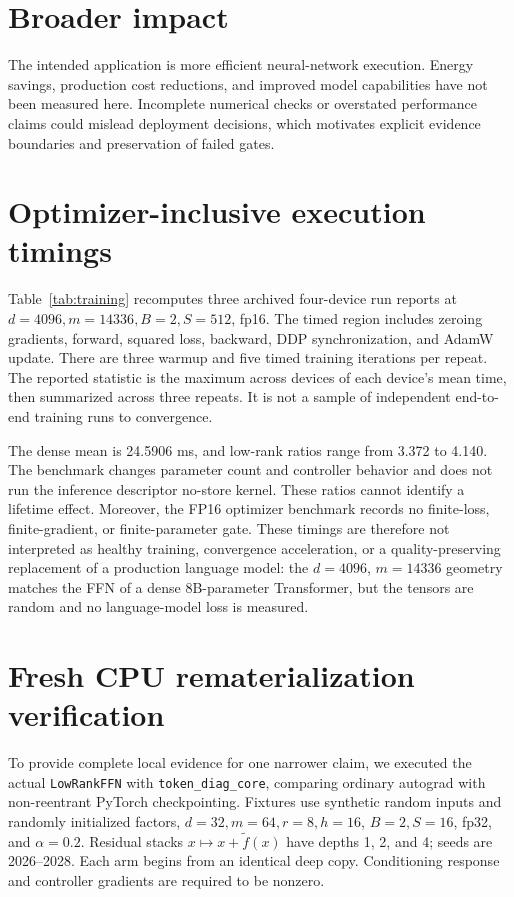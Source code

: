 \section*{Broader impact}
The intended application is more efficient neural-network execution. Energy
savings, production cost reductions, and improved model capabilities have not
been measured here. Incomplete numerical checks or overstated performance
claims could mislead deployment decisions, which motivates explicit evidence
boundaries and preservation of failed gates.


\appendix
\section{Optimizer-inclusive execution timings}
Table~\ref{tab:training} recomputes three archived four-device run reports at
$d=4096,m=14336,B=2,S=512$, fp16. The timed region includes zeroing gradients,
forward, squared loss, backward, DDP synchronization, and AdamW update.
There are three warmup and five timed training iterations per repeat. The
reported statistic is the maximum across devices of each device's mean time,
then summarized across three repeats. It is not a sample of independent
end-to-end training runs to convergence.

\begin{table}[t]
\centering\small
\caption{Archived optimizer-inclusive synchronized execution, mean $\pm$
sample standard deviation across three reports. Ratios use means. These
microbenchmarks lack recorded finite-loss/gradient/update health gates, so they
support execution-time accounting only.}
\label{tab:training}

\end{table}

The dense mean is 24.5906 ms, and low-rank ratios range from 3.372 to 4.140.
The benchmark changes parameter count and controller behavior and does not
run the inference descriptor no-store kernel. These ratios cannot identify a
lifetime effect. Moreover, the FP16 optimizer benchmark records no finite-loss,
finite-gradient, or finite-parameter gate. These timings are therefore not
interpreted as healthy training, convergence acceleration, or a
quality-preserving replacement of a production language model: the
$d{=}4096$, $m{=}14336$ geometry matches the FFN of a dense 8B-parameter
Transformer, but the tensors are random and no language-model loss is
measured.

\section{Fresh CPU rematerialization verification}\label{sec:cpu}
To provide complete local evidence for one narrower claim, we executed the
actual \texttt{LowRankFFN} with \texttt{token\_diag\_core}, comparing ordinary
autograd with non-reentrant PyTorch checkpointing. Fixtures use synthetic
random inputs and randomly initialized factors, $d=32,m=64,r=8,h=16$,
$B=2,S=16$, fp32, and $\alpha=0.2$. Residual stacks
$x\mapsto x+\widetilde f(x)$ have depths 1, 2, and 4; seeds are 2026--2028.
Each arm begins from an identical deep copy. Conditioning response and
controller gradients are required to be nonzero.

